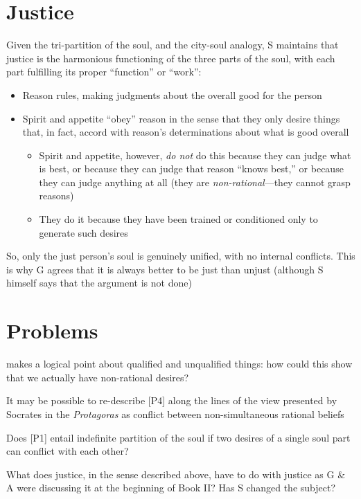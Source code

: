 \documentclass[11pt]{article}
\begin{document}
\section*{Justice}

\noindent Given the tri-partition of the soul, and the city-soul analogy, S maintains that justice is the harmonious functioning of the three parts of the soul, with each part fulfilling its proper ``function'' or ``work'': 

\begin{itemize}\item{Reason rules, making judgments about the overall good for the person}\item{Spirit and appetite ``obey'' reason in the sense that they only desire things that, in fact, accord with reason's determinations about what is good overall}\begin{itemize}\item{Spirit and appetite, however, \emph{do not} do this because they can judge what is best, or because they can judge that reason ``knows best,'' or because they can judge anything at all (they are \emph{non-rational}---they cannot grasp reasons)}\item{They do it because they have been trained or conditioned only to generate such desires}\end{itemize}\end{itemize}

\noindent So, only the just person's soul is genuinely unified, with no internal conflicts. This is why G agrees that it is always better to be just than unjust (although S himself says that the argument is not done)

\section*{Problems}

\noindent [P3] makes a logical point about qualified and unqualified things: how could this show that we actually have non-rational desires?
\vspace*{2mm}

\noindent It may be possible to re-describe [P4] along the lines of the view presented by Socrates in the \emph{Protagoras} as conflict between non-simultaneous rational beliefs
\vspace*{2mm}

\noindent Does [P1] entail indefinite partition of the soul if two desires of a single soul part can conflict with each other?
\vspace*{1mm}

\noindent What does justice, in the sense described above, have to do with justice as G \& A were discussing it at the beginning of Book II? Has S changed the subject?
\end{document}

